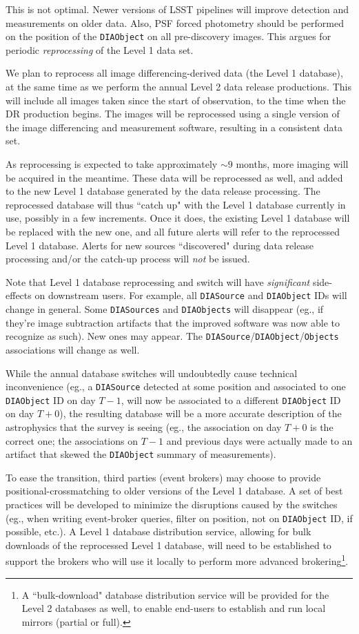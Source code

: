 \documentclass[12pt]{article}
\newcommand{\code}[1]{\texttt{#1}}
\newcommand{\DIASource}{\code{DIASource}\xspace}
\newcommand{\DIASources}{\code{DIASources}\xspace}
\newcommand{\DIAObject}{\code{DIAObject}\xspace}
\newcommand{\DIAObjects}{\code{DIAObjects}\xspace}
\newcommand{\DB}{{Level 1 database}\xspace}
\newcommand{\DR}{{Level 2 database}\xspace}
\newcommand{\Objects}{\code{Objects}\xspace}
\begin{document}
This is not optimal. Newer versions of LSST pipelines will improve detection
and measurements on older data. Also, PSF forced photometry should be
performed on the position of the \DIAObject on all pre-discovery images. This
argues for periodic {\em reprocessing} of the Level 1 data set.

\vspace{1em}

We plan to reprocess all image differencing-derived data (the \DB), at the
same time as we perform the annual Level 2 data release productions. This will
include all images taken since the start of observation, to the time when the
DR production begins. The images will be reprocessed using a single version of
the image differencing and measurement software, resulting in a consistent
data set.

As reprocessing is expected to take approximately $\sim 9$ months, more
imaging will be acquired in the meantime. These data will be reprocessed as
well, and added to the new \DB generated by the data release processing. The
reprocessed database will thus ``catch up" with the \DB currently in use,
possibly in a few increments. Once it does, the existing \DB will be replaced
with the new one, and all future alerts will refer to the reprocessed \DB.
Alerts for new sources ``discovered" during data release processing and/or the
catch-up process will {\em not} be issued.

\vspace{1em}
Note that \DB reprocessing and switch will have {\em significant} side-effects
on downstream users. For example, all \DIASource and \DIAObject IDs will
change in general. Some \DIASources and \DIAObjects will disappear (eg., if
they're image subtraction artifacts that the improved software was now able to
recognize as such). New ones may appear. The \DIASource/\DIAObject/\Objects
associations will change as well.

While the annual database switches will undoubtedly cause technical
inconvenience (eg., a \DIASource detected at some position and associated to
one \DIAObject ID on day $T-1$, will now be associated to a different
\DIAObject ID on day $T+0$), the resulting database will be a more accurate
description of the astrophysics that the survey is seeing (eg., the
association on day $T+0$ is the correct one; the associations on $T-1$ and
previous days were actually made to an artifact that skewed the \DIAObject
summary of measurements).

To ease the transition, third parties (event brokers) may choose to provide
positional-crossmatching to older versions of the \DB. A set of best practices
will be developed to minimize the disruptions caused by the switches (eg.,
when writing event-broker queries, filter on position, not on \DIAObject ID,
if possible, etc.). A \DB distribution service, allowing for bulk downloads of
the reprocessed \DB, will need to be established to support the brokers who
will use it locally to perform more advanced brokering\footnote{A
``bulk-download" database distribution service will be provided for the \DR{}s
as well, to enable end-users to establish and run local mirrors (partial or
full).}.
\end{document}
